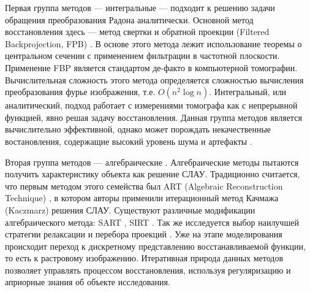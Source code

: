 Первая группа методов --- интегральные \cite{herman2013mathematical}  --- подходит к решению задачи обращения преобразования Радона аналитически. 
Основной метод восстановления здесь --- метод свертки и обратной проекции (Filtered Backprojection, FPB) \cite{buzug2008computed}.
В основе этого метода лежит использование теоремы о центральном сечении с применением фильтрации в частотной плоскости.
Применение FBP является стандартом де-факто в компьютерной томографии. 
Вычислительная сложность этого метода определяется сложностью вычисления преобразования фурье изображения, т.е. $O(n^2 \log n)$.
Интегральный, или аналитический, подход работает с измерениями томографа как с непрерывной функцией, явно решая задачу восстановления.
Данная группа методов является вычислительно эффективной, однако может порождать некачественные востановления, содержащие высокий уровень шума и артефакты \cite{Lucas_sota_ir_survey_2015_radiology}.

Вторая группа методов --- алгебраические \cite{algebraic_methods}. 
Алгебраические методы пытаются получить характеристику объекта как решение СЛАУ.
Традиционно считается, что первым методом этого семейства был ART (Algebraic Reconstruction Technique) \cite{GORDON1970471}, в котором авторы применили итерационный метод Качмажа (Kaczmarz) \cite{Kaczmarz1937} решения СЛАУ.
Существуют различные модификации алгебраического метода: SART \cite{sart}, SIRT \cite{GILBERTSIRT}.
Так же исследуется выбор наилучшей стратегии релаксации \cite{art_regparam} и перебора проекций \cite{art_pointschoice}.
Уже на этапе моделирования происходит переход к дискретному представлению восстанавливаемой функции, то есть к растровому изображению. 
Итеративная природа данных методов позволяет управлять процессом восстановления, используя регуляризацию и априорные знания об объекте исследования.

